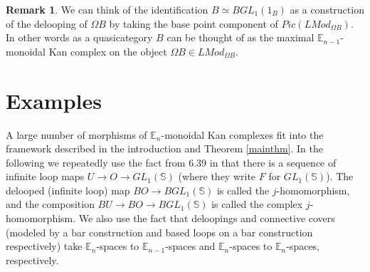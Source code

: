 \documentclass{article}
\theoremstyle{definition}
\newtheorem{rem}{Remark}
\theoremstyle{plain}
\newcommand{\sph}{\mathbb{S}}
\newcommand{\E}{\mathbb{E}}
\begin{document}
\begin{rem}
We can think of the identification $B\simeq BGL_1(1_B)$ as a construction of the delooping of $\Omega B$ by taking the base point component of $Pic(LMod_{\Omega B})$. In other words as a quasicategory $B$ can be thought of as the maximal $\E_{n-1}$-monoidal Kan complex on the object $\Omega B\in LMod_{\Omega B}$. 
\end{rem}

\section{Examples}\label{interexs}

A large number of morphisms of $\E_n$-monoidal Kan complexes  fit into the framework described in the introduction and Theorem \ref{mainthm}. In the following we repeatedly use the fact from 6.39 in \cite{boardvogt} that there is a sequence of infinite loop maps $U\to O\to GL_1(\sph)$ (where they write $F$ for $GL_1(\sph)$). The delooped (infinite loop) map $BO\to BGL_1(\sph)$ is called the $j$-homomorphism, and  the composition $BU\to BO\to BGL_1(\sph)$ is called the complex $j$-homomorphism.  We also use the fact that deloopings and connective covers (modeled by a bar construction and based loops on a bar construction respectively) take $\E_n$-spaces to $\E_{n-1}$-spaces and $\E_n$-spaces to $\E_n$-spaces, respectively. 
\end{document}
